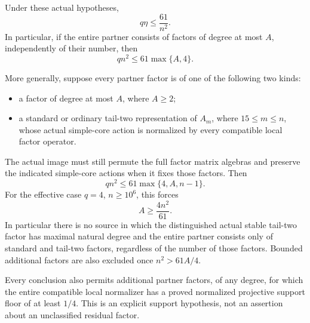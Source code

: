 \begin{theorem}[HD-FT19]
Under these actual hypotheses,
\[
                             q\eta\le\frac{61}{n^2}.
 \tag{FTP.7}
\]
In particular, if the entire partner consists of factors of degree
at most \(A\), independently of their number, then
\[
                     qn^2\le61\max\{A,4\}.
 \tag{FTP.8}
\]

More generally, suppose every partner factor is of one of the
following two kinds:
\begin{itemize}
\item a factor of degree at most \(A\), where \(A\ge2\);
\item a standard or ordinary tail-two representation of \(A_m\),
where \(15\le m\le n\), whose actual simple-core action is
normalized by every compatible local factor operator.
\end{itemize}
The actual image must still permute the full factor matrix algebras
and preserve the indicated simple-core actions when it fixes those
factors.  Then
\[
                  qn^2\le61\max\{4,A,n-1\}.
 \tag{FTP.9}
\]
For the effective case \(q=4\), \(n\ge10^6\), this forces
\[
                             A\ge\frac{4n^2}{61}.
 \tag{FTP.10}
\]
In particular there is no source in which the distinguished actual
stable tail-two factor has maximal natural degree and the entire
partner consists only of standard and tail-two factors, regardless
of the number of those factors.  Bounded additional factors are
also excluded once \(n^2>61A/4\).

Every conclusion also permits additional partner factors, of any
degree, for which the entire compatible local normalizer has a
proved normalized projective support floor of at least \(1/4\).
This is an explicit support hypothesis, not an assertion about an
unclassified residual factor.
\end{theorem}

